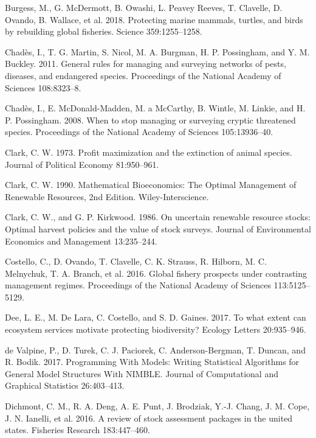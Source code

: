 \documentclass[3p]{elsarticle} %
\begin{document}
\leavevmode\hypertarget{ref-Burgess2018}{}%
Burgess, M., G. McDermott, B. Owashi, L. Peavey Reeves, T. Clavelle, D.
Ovando, B. Wallace, et al. 2018. Protecting marine mammals, turtles, and
birds by rebuilding global fisheries. Science 359:1255--1258.

\leavevmode\hypertarget{ref-Chades2011}{}%
Chadès, I., T. G. Martin, S. Nicol, M. A. Burgman, H. P. Possingham, and
Y. M. Buckley. 2011. General rules for managing and surveying networks
of pests, diseases, and endangered species. Proceedings of the National
Academy of Sciences 108:8323--8.

\leavevmode\hypertarget{ref-Chades2008}{}%
Chadès, I., E. McDonald-Madden, M. a McCarthy, B. Wintle, M. Linkie, and
H. P. Possingham. 2008. When to stop managing or surveying cryptic
threatened species. Proceedings of the National Academy of Sciences
105:13936--40.

\leavevmode\hypertarget{ref-Clark1973}{}%
Clark, C. W. 1973. Profit maximization and the extinction of animal
species. Journal of Political Economy 81:950--961.

\leavevmode\hypertarget{ref-Clark1990}{}%
Clark, C. W. 1990. Mathematical Bioeconomics: The Optimal Management of
Renewable Resources, 2nd Edition. Wiley-Interscience.

\leavevmode\hypertarget{ref-Clark1986}{}%
Clark, C. W., and G. P. Kirkwood. 1986. On uncertain renewable resource
stocks: Optimal harvest policies and the value of stock surveys. Journal
of Environmental Economics and Management 13:235--244.

\leavevmode\hypertarget{ref-Costello2016}{}%
Costello, C., D. Ovando, T. Clavelle, C. K. Strauss, R. Hilborn, M. C.
Melnychuk, T. A. Branch, et al. 2016. Global fishery prospects under
contrasting management regimes. Proceedings of the National Academy of
Sciences 113:5125--5129.

\leavevmode\hypertarget{ref-Dee2017}{}%
Dee, L. E., M. De Lara, C. Costello, and S. D. Gaines. 2017. To what
extent can ecosystem services motivate protecting biodiversity? Ecology
Letters 20:935--946.

\leavevmode\hypertarget{ref-nimble}{}%
de Valpine, P., D. Turek, C. J. Paciorek, C. Anderson-Bergman, T.
Duncan, and R. Bodik. 2017. Programming With Models: Writing Statistical
Algorithms for General Model Structures With NIMBLE. Journal of
Computational and Graphical Statistics 26:403--413.

\leavevmode\hypertarget{ref-Dichmont2016}{}%
Dichmont, C. M., R. A. Deng, A. E. Punt, J. Brodziak, Y.-J. Chang, J. M.
Cope, J. N. Ianelli, et al. 2016. A review of stock assessment packages
in the united states. Fisheries Research 183:447--460.
\end{document}
